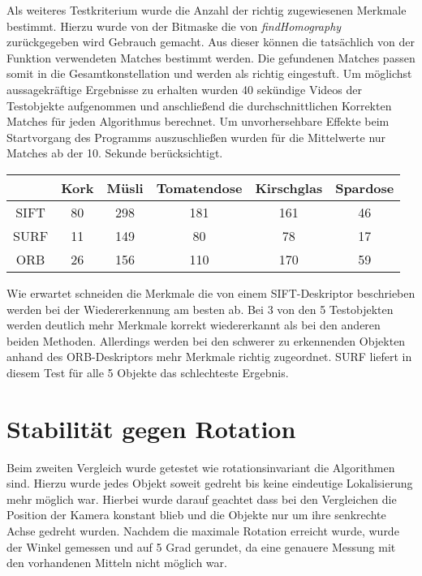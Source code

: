 Als weiteres Testkriterium wurde die Anzahl der richtig zugewiesenen Merkmale bestimmt.
Hierzu wurde von der Bitmaske die von \emph{findHomography} zurückgegeben wird Gebrauch gemacht. Aus dieser können die tatsächlich von der Funktion verwendeten Matches bestimmt werden. Die gefundenen Matches passen somit in die Gesamtkonstellation und werden als richtig eingestuft.
Um möglichst aussagekräftige Ergebnisse zu erhalten wurden 40 sekündige Videos der Testobjekte aufgenommen und anschließend die durchschnittlichen Korrekten Matches für jeden Algorithmus berechnet. Um unvorhersehbare Effekte beim Startvorgang des Programms auszuschließen wurden für die Mittelwerte nur Matches ab der 10. Sekunde berücksichtigt.


\begin{center}
    \begin{tabular}{ c | C | C | C | C | C |}
      & Kork & Müsli & Tomatendose & Kirschglas & Spardose \\ \hline
    SIFT & 80 & 298 & 181 & 161 & 46 \\ \hline
    SURF & 11 & 149 & 80 & 78 & 17 \\ \hline
    ORB & 26 & 156 & 110 & 170 & 59 \\
    \hline
    \end{tabular}
\end{center}

Wie erwartet schneiden die Merkmale die von einem SIFT-Deskriptor beschrieben werden bei der Wiedererkennung am besten ab.
Bei 3 von den 5 Testobjekten werden deutlich mehr Merkmale korrekt wiedererkannt als bei den anderen beiden Methoden.
Allerdings werden bei den schwerer zu erkennenden Objekten anhand des ORB-Deskriptors mehr Merkmale richtig zugeordnet.
SURF liefert in diesem Test für alle 5 Objekte das schlechteste Ergebnis.

\section{Stabilität gegen Rotation}

Beim zweiten Vergleich wurde getestet wie rotationsinvariant die Algorithmen sind.
Hierzu wurde jedes Objekt soweit gedreht bis keine eindeutige Lokalisierung mehr möglich war.
Hierbei wurde darauf geachtet dass bei den Vergleichen die Position der Kamera konstant blieb und die Objekte nur um ihre senkrechte Achse gedreht wurden.
Nachdem die maximale Rotation erreicht wurde, wurde der Winkel gemessen und auf 5 Grad gerundet, da eine genauere Messung mit den vorhandenen Mitteln nicht möglich war.

